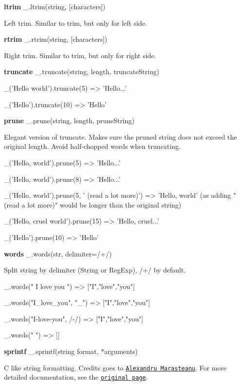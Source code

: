 {\bfseries ltrim} \+\_\+.\+ltrim(string, \mbox{[}characters\mbox{]})

Left trim. Similar to trim, but only for left side.

{\bfseries rtrim} \+\_\+.\+rtrim(string, \mbox{[}characters\mbox{]})

Right trim. Similar to trim, but only for right side.

{\bfseries truncate} \+\_\+.\+truncate(string, length, truncate\+String)


\begin{DoxyCode}
\_('Hello world').truncate(5)
=> 'Hello...'

\_('Hello').truncate(10)
=> 'Hello'
\end{DoxyCode}


{\bfseries prune} \+\_\+.\+prune(string, length, prune\+String)

Elegant version of truncate. Makes sure the pruned string does not exceed the original length. Avoid half-\/chopped words when truncating.


\begin{DoxyCode}
\_('Hello, world').prune(5)
=> 'Hello...'

\_('Hello, world').prune(8)
=> 'Hello...'

\_('Hello, world').prune(5, ' (read a lot more)')
=> 'Hello, world' (as adding "(read a lot more)" would be longer than the original string)

\_('Hello, cruel world').prune(15)
=> 'Hello, cruel...'

\_('Hello').prune(10)
=> 'Hello'
\end{DoxyCode}


{\bfseries words} \+\_\+.\+words(str, delimiter=/+/)

Split string by delimiter (String or Reg\+Exp), /+/ by default.


\begin{DoxyCode}
\_.words("   I   love   you   ")
=> ["I","love","you"]

\_.words("I\_love\_you", "\_")
=> ["I","love","you"]

\_.words("I-love-you", /-/)
=> ["I","love","you"]

\_.words("   ")
=> []
\end{DoxyCode}


{\bfseries sprintf} \+\_\+.\+sprintf(string format, $\ast$arguments)

C like string formatting. Credits goes to \href{http://www.diveintojavascript.com/projects/javascript-sprintf}{\tt Alexandru Marasteanu}. For more detailed documentation, see the \href{http://www.diveintojavascript.com/projects/javascript-sprintf}{\tt original page}.


